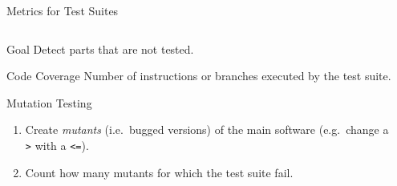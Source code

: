 \documentclass[aspectratio=169,dvipsnames]{beamer}
\begin{document}
\begin{frame}{Metrics for Test Suites}
  \begin{columns}
    \begin{column}{0.75\textwidth}
      \begin{block}{Goal}
        Detect parts that are not tested.
      \end{block}

      \pause{}

      \begin{exampleblock}{Code Coverage}
        Number of instructions or branches executed by the test suite.
      \end{exampleblock}

      \pause{}

      \begin{exampleblock}{Mutation Testing}
        \begin{enumerate}
          \item Create \emph{mutants} (i.e.\ bugged versions) of the main software (e.g.\ change a \texttt{>} with a \texttt{<=}).
          \item Count how many mutants for which the test suite fail.
        \end{enumerate}
      \end{exampleblock}
    \end{column}
    \begin{column}{0.25\textwidth}

\end{column}
\end{columns}
\end{frame}
\end{document}
